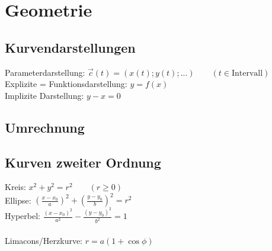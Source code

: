 \section{Geometrie}
\subsection{Kurvendarstellungen}
Parameterdarstellung: $\vec{c}(t) = (x(t); y(t); ...) \qquad (t \in \text{Intervall})$\\
Explizite = Funktionsdarstellung: $y = f(x)$\\
Implizite Darstellung: $y - x = 0$ 


\subsection{Umrechnung}

\subsection{Kurven zweiter Ordnung}
Kreis: $x^2 + y^2 = r^2 \qquad (r \geq 0)$\\
Ellipse: $\left(\frac{x - x_0}{a}\right)^2 + \left(\frac{y - y_0}{b}\right)^2 = r^2$\\
Hyperbel: $\frac{(x - x_0)^2}{a^2} - \frac{(y - y_0)^2}{b^2} = 1$\\
~\\
Limacons/Herzkurve: $r = a(1 + \cos\phi)$